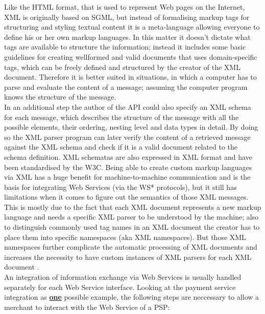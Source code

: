 Like the \gls{HTML} format, that is used to represent Web pages on the Internet, \gls{XML} is originally based on \gls{SGML}, but instead of formalising markup tags for structuring and styling textual content it is a meta-language allowing everyone to define his or her own markup languages. In this matter it doesn’t dictate what tags are available to structure the information; instead it includes some basic guidelines for creating wellformed and valid documents that uses domain-specific tags, which can be freely defined and structured by the creator of the \gls{XML} document. Therefore it is better suited in situations, in which a computer has to parse and evaluate the content of a message; assuming the computer program knows the structure of the message. \\

In an additional step the author of the \gls{API} could also specify an \gls{XML} schema for each message, which describes the structure of the message with all the possible elements, their ordering, nesting level and data types in detail. By doing so the \gls{XML} parser program can later verify the content of a retrieved message against the \gls{XML} schema and check if it is a valid document related to the schema definition. \gls{XML} schematas are also expressed in \gls{XML} format and have been standardised by the \gls{W3C}. Being able to create custom markup languages via \gls{XML} has a huge benefit for machine-to-machine communication and is the basis for integrating Web Services (via the WS* protocols), but it still has limitations when it comes to figure out the semantics of those \gls{XML} messages. This is mostly due to the fact that each \gls{XML} document represents a new markup language and needs a specific \gls{XML} parser to be understood by the machine; also to distinguish commonly used tag names in an \gls{XML} document the creator has to place them into specific namespaces (aka \gls{XML} namespaces). But those \gls{XML} namespaces further complicate the automatic processing of \gls{XML} documents and increases the necessity to have custom instances of \gls{XML} parsers for each \gls{XML} document \citep{taylor2008p2p}. \\

An integration of information exchange via Web Services is usually handled separately for each Web Service interface. Looking at the payment service integration as \textbf{\underline{one}} possible example, the following steps are neccessary to allow a merchant to interact with the Web Service of a \gls{PSP}: \@

